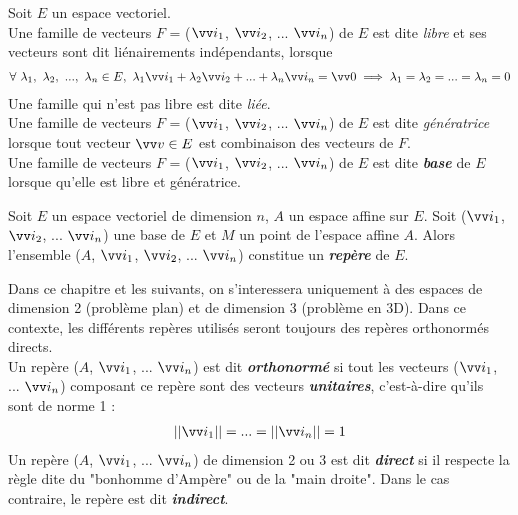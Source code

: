 \documentclass[10.5pt,a4paper]{book}
\begin{document}
\begin{boite}
Soit $E$ un espace vectoriel.\\

Une famille de vecteurs $F$ = ($\vv i_1$, $\vv i_2$, ... $\vv i_n$) de $E$ est dite \emph{libre} et ses vecteurs sont dit liénairements indépendants, lorsque
\begin{align*}
\forall \ \lambda_1,\ \lambda_2,\ ...,\ \lambda_n \in E,\ \lambda_1 \vv i_1 + \lambda_2 \vv i_2 + ... + \lambda_n \vv i_n = \vv 0 \implies \lambda_1= \lambda_2= ...=\lambda_n = 0
\end{align*}
Une famille qui n'est pas libre est dite \emph{liée}.\\

Une famille de vecteurs $F$ = ($\vv i_1$, $\vv i_2$, ... $\vv i_n$) de $E$ est dite \emph{génératrice} lorsque tout vecteur $\vv v \in E$ est combinaison des vecteurs de $F$.\\

Une famille de vecteurs $F$ = ($\vv i_1$, $\vv i_2$, ... $\vv i_n$) de $E$ est dite \emph{\textbf{base}} de $E$ lorsque qu'elle est libre et génératrice.
\end{boite}

\begin{boite}[Repère]
Soit $E$ un espace vectoriel de dimension $n$, $A$ un espace affine sur $E$. Soit ($\vv i_1$, $\vv i_2$, ... $\vv i_n$) une base de $E$ et $M$ un point de l'espace affine $A$. Alors l'ensemble ($A$, $\vv i_1$, $\vv i_2$, ... $\vv i_n$) constitue un \emph{\textbf{repère}} de $E$.
\end{boite}

\begin{boite}
Dans ce chapitre et les suivants, on s'interessera uniquement à des espaces de dimension 2 (problème plan) et de dimension 3 (problème en 3D). Dans ce contexte, les différents repères utilisés seront toujours des repères orthonormés directs.\\

Un repère ($A$, $\vv i_1$, ... $\vv i_n$) est dit \emph{\textbf{orthonormé}} si tout les vecteurs ($\vv i_1$, ... $\vv i_n$) composant ce repère sont des vecteurs \emph{\textbf{unitaires}}, c'est-à-dire qu'ils sont de norme 1 : 
\begin{align*}
 \left|\left|\vv i_1\right|\right|= ... =\left|\left|\vv i_n\right|\right|= 1
\end{align*}
Un repère ($A$, $\vv i_1$, ... $\vv i_n$) de dimension 2 ou 3 est dit \emph{\textbf{direct}} si il respecte la règle dite du "bonhomme d'Ampère" ou de la "main droite". Dans le cas contraire, le repère est dit \emph{\textbf{indirect}}.
\end{boite}
\end{document}
